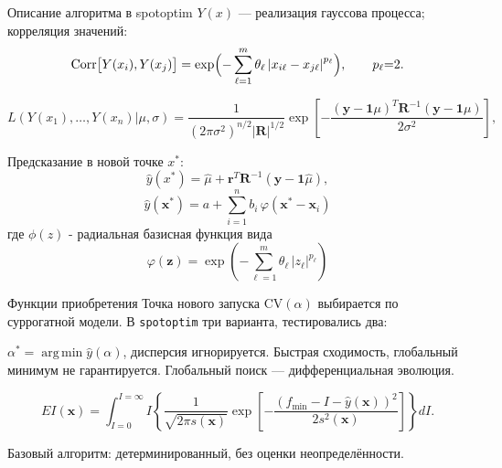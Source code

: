\documentclass[10pt,aspectratio=169]{beamer}
\newcommand{\abs}[1]{\left|#1\right|}
\newcommand{\EQ}{{=}}
\newcommand{\CV}{\mathrm{CV}}
\newcommand{\argmin}{\mathop{\mathrm{arg\,min}}}
\newcommand{\dima}{m}%
\newcommand{\spotoptim}{\texttt{spotoptim}\xspace}
\begin{document}
\begin{frame}{Описание алгоритма в spotoptim}
  $Y(x)$ --- реализация гауссова процесса; корреляция значений:
  \[
    \mathrm{Corr}\bigl[Y(x_i),Y(x_j)\bigr]
      = \exp\Bigl(-\sum_{\ell=1}^{m}\theta_\ell \abs{x_{i\ell}-x_{j\ell}}^{p_\ell}\Bigr),
    \qquad p_\ell\EQ 2.
  \]

$$
L({Y(x_1)}, \ldots, {Y(x_n)} | \mu, \sigma) = \frac{1}{(2\pi\sigma^2)^{n/2} |\mathbf{R}|^{1/2}} \exp \left[ -\frac{(\mathbf{y} - \mathbf{1}\mu)^T \mathbf{R}^{-1} (\mathbf{y} - \mathbf{1}\mu)}{2\sigma^2} \right],
$$

  Предсказание в новой точке $x^*$:
  $$
    \hat y(x^*) = \hat\mu + \mathbf{r}^T\mathbf{R}^{-1}(\mathbf{y}-\mathbf{1}\hat\mu),
  $$
  $$
\hat{y}(\mathbf{x}^{*}) = a + \sum_{i=1}^{n} b_{i} \, \varphi(\mathbf{x}^{*} - \mathbf{x}_{i})
$$
где $\phi(z)$ - радиальная базисная функция вида
$$
\varphi(\mathbf{z}) = \exp\left(-\sum_{\ell=1}^{\dima} \theta_{\ell} \, |z_{\ell}|^{p_{\ell}}\right) 
$$
\end{frame}
\begin{frame}{Функции приобретения}
  Точка нового запуска $\CV(\alpha)$ выбирается по суррогатной модели.
  В \spotoptim три варианта, тестировались два:

  \vspace{0.6em}
  \begin{description}\setlength{\itemsep}{0.6em}
    \item[Математическое ожидание (\spotoptim-y)]
      $\alpha^{*}=\argmin \hat y(\alpha)$, дисперсия игнорируется.
      Быстрая сходимость, глобальный минимум не гарантируется.
      Глобальный поиск --- дифференциальная эволюция.

    \item[Expected Improvement (\spotoptim-ei)]
    $$
    EI(\mathbf{x}) = \int_{I=0}^{I=\infty} I \left\{ \frac{1}{\sqrt{2\pi s(\mathbf{x})}} \exp \left[ -\frac{(f_{\text{min}} - I - \hat{y}(\mathbf{x}))^2}{2s^2(\mathbf{x})} \right] \right\} dI.
    $$
  \end{description}
  \vfill
  Базовый алгоритм: детерминированный, без оценки неопределённости.
\end{frame}
\end{document}
